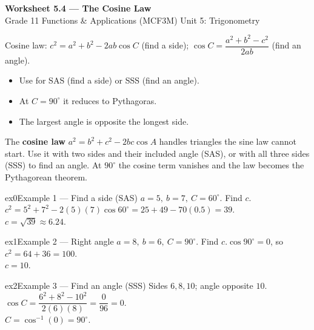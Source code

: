 \documentclass[11pt]{article}
\begin{document}
\begin{center}
{\LARGE\bfseries\color{titleblue}Worksheet 5.4 --- The Cosine Law}\\[2pt]
{\small Grade 11 Functions \& Applications (MCF3M) \textperiodcentered{} Unit 5: Trigonometry}
\end{center}

\begin{ideabox}
Cosine law: $c^2=a^2+b^2-2ab\cos C$ (find a side); $\cos C=\dfrac{a^2+b^2-c^2}{2ab}$ (find an angle).
\begin{itemize}[leftmargin=*,itemsep=2pt]
  \item Use for SAS (find a side) or SSS (find an angle).
  \item At $C=90^\circ$ it reduces to Pythagoras.
  \item The largest angle is opposite the longest side.
\end{itemize}
\end{ideabox}

\begin{learnbox}
The \textbf{cosine law} $a^2=b^2+c^2-2bc\cos A$ handles triangles the sine law cannot start.
Use it with two sides and their included angle (SAS), or with all three sides (SSS) to find an angle.
At $90^\circ$ the cosine term vanishes and the law becomes the Pythagorean theorem.
\end{learnbox}


\begin{example}{ex0}{Example 1 --- Find a side (SAS)}
$a=5,\ b=7,\ C=60^\circ$. Find $c$.\soln $c^2=5^2+7^2-2(5)(7)\cos60^\circ=25+49-70(0.5)=39$. \\ $c=\sqrt{39}\approx6.24$.
\end{example}

\begin{example}{ex1}{Example 2 --- Right angle}
$a=8,\ b=6,\ C=90^\circ$. Find $c$.\soln $\cos90^\circ=0$, so $c^2=64+36=100$. \\ $c=10$.
\end{example}

\begin{example}{ex2}{Example 3 --- Find an angle (SSS)}
Sides $6,8,10$; angle opposite $10$.\soln $\cos C=\dfrac{6^2+8^2-10^2}{2(6)(8)}=\dfrac{0}{96}=0$. \\ $C=\cos^{-1}(0)=90^\circ$.
\end{example}
\end{document}
